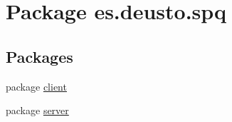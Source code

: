 \hypertarget{namespacees_1_1deusto_1_1spq}{}\section{Package es.\+deusto.\+spq}
\label{namespacees_1_1deusto_1_1spq}
\subsection*{Packages}
\begin{DoxyCompactItemize}
\item 
package \hyperlink{namespacees_1_1deusto_1_1spq_1_1client}{client}
\item 
package \hyperlink{namespacees_1_1deusto_1_1spq_1_1server}{server}
\end{DoxyCompactItemize}
